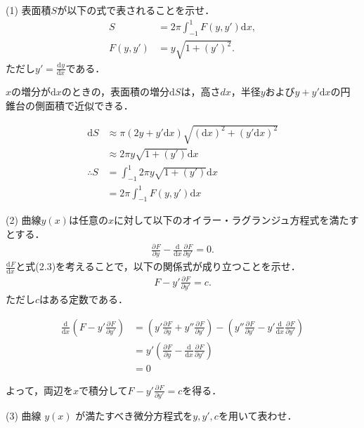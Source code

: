 \documentclass[a4j]{jarticle}
\let \ds \displaystyle
\newcommand{\diff}[3]{
  \frac{\mathrm{d}^{#1} #2}{\mathrm{d} #3^{#1}}
}
\newcommand{\pdiff}[3]{
  \frac{\partial^{#1} #2}{\partial #3^{#1}}
}
\begin{document}
\begin{screen}
 (1) 表面積$S$が以下の式で表されることを示せ．
 \begin{align*}
  S &= 2 \pi \int_{-1}^1 F(y,y') \mathrm{d}x,\tag{2.1} \\
  F(y,y') &=y \sqrt{ 1 + \left(y'\right)^2}. \tag{2.2}
 \end{align*}
 ただし$\ds y' = \diff{}{y}{x}$である．
\end{screen}

$x$の増分が$\mathrm{d}x$のときの，表面積の増分$\mathrm{d}S$は，高さ$dx$，半径$y$および$y+y'\mathrm{d}x$の円錐台の側面積で近似できる．

\begin{align*}
 \mathrm{d}S &\approx \pi (2y+y'\mathrm{d}x) \sqrt{(\mathrm{d}x)^2+(y'\mathrm{d}x)^2} \\
 &\approx 2 \pi y \sqrt{1+(y')}\mathrm{d}x \\
 \therefore S &= \int_{-1}^{1} 2 \pi y \sqrt{1+(y')}\mathrm{d}x \\
 &= 2 \pi \int_{-1}^1 F(y,y') \mathrm{d}x
\end{align*}

\begin{screen}
 (2) 曲線$y(x)$は任意の$x$に対して以下のオイラー・ラグランジュ方程式を満たすとする．
 \begin{align*}
  \pdiff{}{F}{y} - \diff{}{}{x}\pdiff{}{F}{y'} = 0. \tag{2.3}
 \end{align*}
 $\ds \diff{}{F}{x}$と式(2.3)を考えることで，以下の関係式が成り立つことを示せ．
 \begin{align*}
  F - y'\pdiff{}{F}{y'} = c. \tag{2.4}
 \end{align*}
 ただし$c$はある定数である．
\end{screen}

\begin{align*}
 \diff{}{}{x}\left(F - y'\pdiff{}{F}{y'}\right) &= \left(y' \pdiff{}{F}{y} + y'' \pdiff{}{F}{y'}\right) - \left(y''\pdiff{}{F}{y'} - y' \diff{}{}{x} \pdiff{}{F}{y'}\right) \\
 &= y' \left(\pdiff{}{F}{y} - \diff{}{}{x}\pdiff{}{F}{y'}\right) \\
 &= 0
\end{align*}

よって，両辺を$x$で積分して$\ds F - y'\pdiff{}{F}{y'} = c$を得る．

\begin{screen}
 (3) 曲線 $y(x)$ が満たすべき微分方程式を$y,y',c$を用いて表わせ．
\end{screen}
\end{document}
